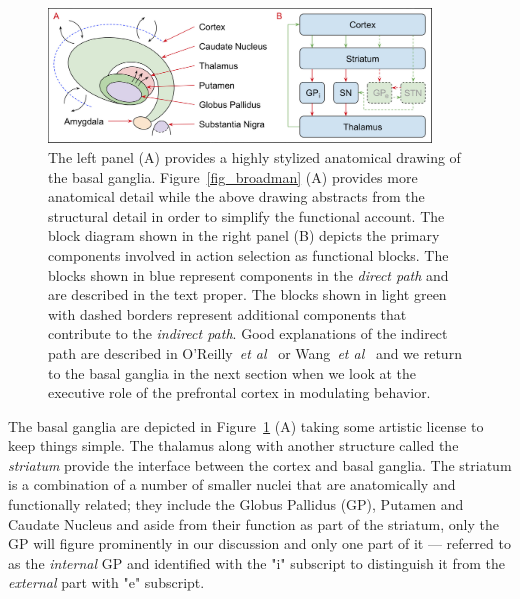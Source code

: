 \documentclass[letterpaper,11pt]{article}
\def\colorred#1{{\color{red}#1}}
\def\urlh#1{{}}
\def\emdash{---}
\def\etal{{\em{et al}}}
\begin{document}
\begin{figure}
%
  \begin{center}
    \includegraphics[width=4.0in]{./figures/Basal_Ganglia_Anatomy_and_Physiology.jpg} %
  \end{center}
%
  \caption{The left panel ({\colorred{A}}) provides a highly stylized anatomical drawing of the basal ganglia. Figure~\ref{fig_broadman} ({\colorred{A}}) provides more anatomical detail while the above drawing abstracts from the structural detail in order to simplify the functional account. The block diagram shown in the right panel ({\colorred{B}}) depicts the primary components involved in action selection as functional blocks. The blocks shown in blue represent components in the {\it{direct path}} and are described in the text proper. The blocks shown in light green with dashed borders represent additional components that contribute to the {\it{indirect path}}. Good explanations of the indirect path are described in O'Reilly~\etal{}~\cite{OReillyetalCCN-12} or Wang~\etal{}~\cite{WangetalNATURE-NEUROSCIENCE-18} and we return to the basal ganglia in the next section when we look at the executive role of the prefrontal cortex in modulating behavior.}
%
  \label{fig_basal}
%
\end{figure}


The basal ganglia are depicted in Figure~{\urlh{#fig_Basal_Ganglia_Anatomy_and_Physiology}{\ref{fig_basal}}} ({\colorred{A}}) taking some artistic license to keep things simple. The thalamus along with another structure called the {\it{striatum}} provide the interface between the cortex and basal ganglia. The striatum is a combination of a number of smaller nuclei that are anatomically and functionally related; they include the Globus Pallidus (GP), Putamen and Caudate Nucleus and aside from their function as part of the striatum, only the GP will figure prominently in our discussion and only one part of it \emdash{} referred to as the {\it{internal}} GP and identified with the "i" subscript to distinguish it from the {\it{external}} part with "e" subscript.
\end{document}

